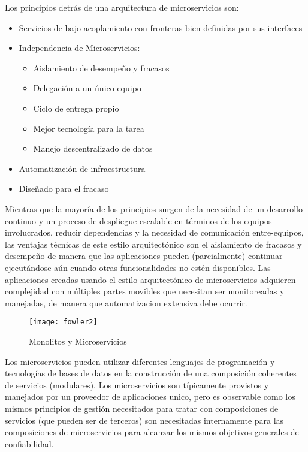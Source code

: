         {Los principios detrás de una arquitectura de microservicios son:}
        
        \begin{itemize}
            \item {Servicios de bajo acoplamiento con fronteras bien definidas por sus
              interfaces}
            \item {Independencia de Microservicios:}
                \begin{itemize}
                \item {Aislamiento de desempeño y fracasos}
                \item {Delegación a un único equipo}
                \item {Ciclo de entrega propio}
                \item {Mejor tecnología para la tarea}
                \item {Manejo descentralizado de datos }
                \end{itemize}
            \item {Automatización de infraestructura}
            \item {Diseñado para el fracaso}
        \end{itemize} 
        Mientras que la mayoría de los principios surgen de la necesidad de un desarrollo continuo y un proceso de despliegue escalable en términos de los equipos involucrados, reducir dependencias y la necesidad de comunicación entre-equipos, las ventajas técnicas de este estilo arquitectónico son el aislamiento de fracasos y desempeño de manera que las aplicaciones pueden (parcialmente) continuar ejecutándose aún cuando otras funcionalidades no estén disponibles. Las aplicaciones creadas usando el estilo arquitectónico de microservicios adquieren complejidad con múltiples partes movibles que necesitan ser monitoreadas y manejadas, de manera que automatizacion extensiva debe ocurrir.
        \begin{figure}[H]
            \centering
            \texttt{[image: fowler2]}
            \caption{Monolitos y Microservicios \protect\cite{Lewis2016-az}}
            \label{fig:fowler2}
        \end{figure}

        Los microservicios pueden utilizar diferentes lenguajes de programación y tecnologías de bases de datos en la construcción de una composición coherentes de servicios (modulares). Los microservicios son típicamente provistos y manejados por un proveedor de aplicaciones unico, pero es observable como los mismos principios de gestión necesitados para tratar con composiciones de servicios (que pueden ser de terceros) son necesitadas internamente para las composiciones de microservicios para alcanzar los mismos objetivos generales de confiabilidad.
        
